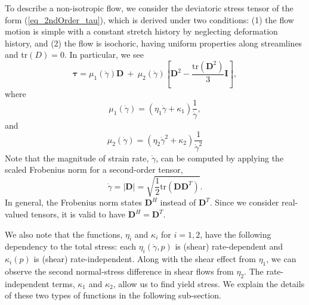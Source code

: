 To describe a non-isotropic flow, we consider the deviatoric stress tensor of the form (\ref{eq_2ndOrder_tau}), which is derived under two conditions:
(1) the flow motion is simple with a constant stretch history by neglecting deformation history, and (2) the flow is isochoric, having uniform properties along streamlines and tr$(D) = 0$. 
In particular, we see \cite{srivastava_viscometric_2021}
\begin{equation}
  {\bm {\bm \tau}}
  = \mu_1(\dot{\gamma}) {\bm D}
  \ +  \ 
 \mu_2 (\dot{\gamma})
  \left[ {\bm D}^2  - \frac{\text{tr}\left({\bm D}^2\right)}{3}{\bm I} \right],
\label{eq_2ndOrder_tau}
\end{equation}
where 
\begin{equation}
  \mu_1 (\dot{\gamma})
   = \left( \eta_1 \dot{\gamma}+ \kappa_1 \right) \frac{1}{\dot{\gamma}},
\label{eq_mu1_main}
\end{equation}
and 
\begin{equation}
  \mu_2 (\dot{\gamma}) = 
  \left( \eta_2  \dot{\gamma}^2
  +  \kappa_2 
  \right) \frac{1}{\dot{\gamma}^2}
  \label{eq_mu2_main}
\end{equation}
Note that the magnitude of strain rate, $\dot{\gamma}$, can be computed by applying the scaled Frobenius norm for a second-order tensor, 
\[
  \dot{\gamma}  = |\bm{D}| = \sqrt{\frac{1}{2}
    \text{tr}\left(\bm{D} \bm{D}^{T} \right)}.
\]
In general, the Frobenius norm states $\bm{D}^H$ instead of $\bm{D}^T$. Since we consider real-valued tensors, it is valid to have $\bm{D}^H = \bm{D}^T$.
\par
We also note that the functions, $\eta_i$ and $\kappa_i$ for $i = 1,2$, have the following dependency to the total stress: each $\eta_i(\dot{\gamma}, p)$ is (shear) rate-dependent and $\kappa_i (p)$ is (shear) rate-independent. 
Along with the shear effect from $\eta_1$, we can observe the second normal-stress difference in shear flows from $\eta_2$.
The rate-independent terms, $\kappa_1$ and $\kappa_2$, allow us to find yield stress. 
We explain the details of these two types of functions in the following sub-section.

